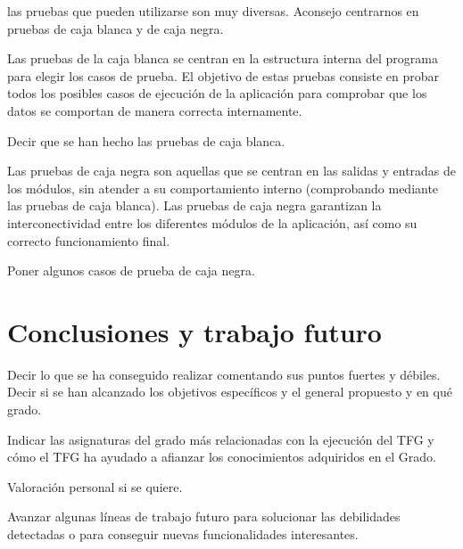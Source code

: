 \documentclass[a4paper,11pt]{book}
\begin{document}
las pruebas que pueden utilizarse son muy diversas. Aconsejo centrarnos en pruebas de caja blanca y de caja negra.

Las pruebas de la caja blanca se centran en la estructura interna del programa para elegir los casos de prueba. El objetivo de estas pruebas consiste en probar todos los posibles casos de ejecución de la aplicación para comprobar que los datos se comportan de manera correcta internamente.

Decir que se han hecho las pruebas de caja blanca.

Las pruebas de caja negra son aquellas que se centran en las salidas y entradas de los módulos, sin atender a su comportamiento interno (comprobando mediante las pruebas de caja blanca). Las pruebas de caja negra garantizan la interconectividad entre los diferentes módulos de la aplicación, así como su correcto funcionamiento final.

Poner algunos casos de prueba de caja negra.

\chapter{Conclusiones y trabajo futuro}

Decir lo que se ha conseguido realizar comentando sus puntos fuertes y débiles.
Decir si se han alcanzado los objetivos específicos y el general propuesto y en qué grado.

Indicar las asignaturas del grado más relacionadas con la ejecución del TFG y cómo el TFG ha ayudado a afianzar los conocimientos adquiridos en el Grado.

Valoración personal si se quiere.


Avanzar algunas líneas de trabajo futuro para solucionar las debilidades detectadas o para conseguir nuevas funcionalidades interesantes.
\end{document}
